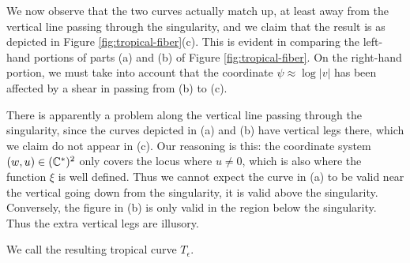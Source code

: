 \documentclass[12pt]{amsart}
\begin{document}
We now observe that the two curves actually match up, at least away from the vertical line passing through the singularity, and we claim that the result is as depicted in Figure \ref{fig:tropical-fiber}(c). This is evident in comparing the left-hand portions of parts (a) and (b) of Figure \ref{fig:tropical-fiber}. On the right-hand portion, we must take into account that the coordinate $\psi \approx \log|v|$ has been affected by a shear in passing from (b) to (c).

 There is apparently a problem along the vertical line passing through the singularity, since the curves depicted in (a) and (b) have vertical legs there, which we claim do not appear in (c). Our reasoning is this: the coordinate system $(w,u) \in (\mathbb{C}^*)^2$ only covers the locus where $u \neq 0$, which is also where the function $\xi$ is well defined. Thus we cannot expect the curve in (a) to be valid near the vertical going down from the singularity, it is valid above the singularity. Conversely, the figure in (b) is only valid in the region below the singularity. Thus the extra vertical legs are illusory. 

We call the resulting tropical curve $T_\epsilon$.






\end{document}
